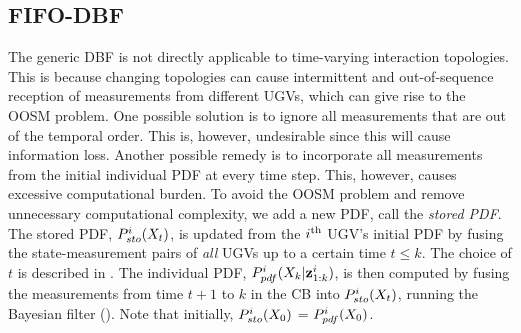 	\subsection{FIFO-DBF}
	The generic DBF is not directly applicable to time-varying interaction topologies. 
	This is because changing topologies can cause intermittent and out-of-sequence reception of measurements from different UGVs, which can give rise to the OOSM problem.
	One possible solution is to ignore all measurements that are out of the temporal order.
	This is, however, undesirable since this will cause information loss.
	Another possible remedy is to incorporate all measurements from the initial individual PDF at every time step.
	This, however, causes excessive computational burden.
	To avoid the OOSM problem and remove unnecessary computational complexity, we add a new PDF, call the \textit{stored PDF}.
	The stored PDF, $P^{i}_{sto}(X_t)$, is updated from the $i^\text{th}$ UGV's initial PDF by fusing the state-measurement pairs of \textit{all} UGVs up to a certain time $t\le k$.
	The choice of $t$ is described in .
	The individual PDF, $P^i_{pdf}(X_k|\mathbf{z}^i_{1:k})$, is then computed by fusing the measurements from time $t+1$ to $k$ in the CB into $P^i_{sto}(X_t)$, running the Bayesian filter ().
	Note that initially, $P^{i}_{sto}(X_0)$ = $P^i_{pdf}(X_0)$.
	

